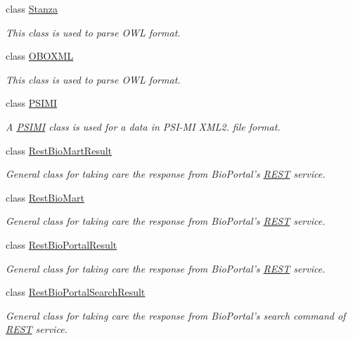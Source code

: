 \begin{DoxyCompactItemize}
class \hyperlink{classunisys_1_1Stanza}{Stanza}
\begin{DoxyCompactList}\small\item\em This class is used to parse O\-W\-L format. \end{DoxyCompactList}\item 
class \hyperlink{classunisys_1_1OBOXML}{O\-B\-O\-X\-M\-L}
\begin{DoxyCompactList}\small\item\em This class is used to parse O\-W\-L format. \end{DoxyCompactList}\item 
class \hyperlink{classunisys_1_1PSIMI}{P\-S\-I\-M\-I}
\begin{DoxyCompactList}\small\item\em A \hyperlink{classunisys_1_1PSIMI}{P\-S\-I\-M\-I} class is used for a data in P\-S\-I-\/\-M\-I X\-M\-L2. file format. \end{DoxyCompactList}\item 
class \hyperlink{classunisys_1_1RestBioMartResult}{Rest\-Bio\-Mart\-Result}
\begin{DoxyCompactList}\small\item\em General class for taking care the response from Bio\-Portal's \hyperlink{classunisys_1_1REST}{R\-E\-S\-T} service. \end{DoxyCompactList}\item 
class \hyperlink{classunisys_1_1RestBioMart}{Rest\-Bio\-Mart}
\begin{DoxyCompactList}\small\item\em General class for taking care the response from Bio\-Portal's \hyperlink{classunisys_1_1REST}{R\-E\-S\-T} service. \end{DoxyCompactList}\item 
class \hyperlink{classunisys_1_1RestBioPortalResult}{Rest\-Bio\-Portal\-Result}
\begin{DoxyCompactList}\small\item\em General class for taking care the response from Bio\-Portal's \hyperlink{classunisys_1_1REST}{R\-E\-S\-T} service. \end{DoxyCompactList}\item 
class \hyperlink{classunisys_1_1RestBioPortalSearchResult}{Rest\-Bio\-Portal\-Search\-Result}
\begin{DoxyCompactList}\small\item\em General class for taking care the response from Bio\-Portal's search command of \hyperlink{classunisys_1_1REST}{R\-E\-S\-T} service. \end{DoxyCompactList}\item 

\end{DoxyCompactItemize}
